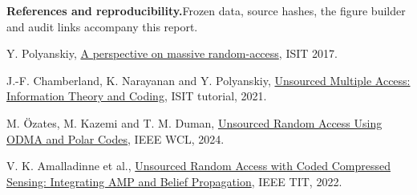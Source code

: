 \documentclass[10pt,a4paper]{article}
\begin{document}
\vspace{2pt}
{\footnotesize
\textbf{References and reproducibility.}\quad Frozen data, source hashes, the figure builder and audit links accompany this report.\par
[1] Y. Polyanskiy, \href{https://people.lids.mit.edu/yp/homepage/data/isit17_mac.pdf}{A perspective on massive random-access}, ISIT 2017.\par
[2] J.-F. Chamberland, K. Narayanan and Y. Polyanskiy,
\href{https://www.itsoc.org/sites/default/files/2021-08/Unsourced\%20Multiple\%20Access\%20\%28UMAC\%29\%20Information\%20Theory\%20and\%20Coding_0.pdf}{Unsourced Multiple Access: Information Theory and Coding}, ISIT tutorial, 2021.\par
[3] M. \"Ozates, M. Kazemi and T. M. Duman,
\href{https://doi.org/10.1109/LWC.2024.3359270}{Unsourced Random Access Using ODMA and Polar Codes}, IEEE WCL, 2024.\par
[4] V. K. Amalladinne et al., \href{https://arxiv.org/abs/2010.04364}{Unsourced Random Access with Coded Compressed Sensing: Integrating AMP and Belief Propagation}, IEEE TIT, 2022.
}
\end{document}
